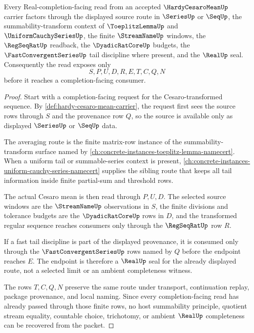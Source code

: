\begin{theorem}\label{thm:hardy-cesaro-mean-regular-transform-handoff}
Every Real-completion-facing read from an accepted $\HardyCesaroMeanUp$ carrier factors through the displayed source route in $\SeriesUp$ or $\SeqUp$, the summability-transform context of $\ToeplitzLemmaUp$ and $\UniformCauchySeriesUp$, the finite $\StreamNameUp$ windows, the $\RegSeqRatUp$ readback, the $\DyadicRatCoreUp$ budgets, the $\FastConvergentSeriesUp$ tail discipline where present, and the $\RealUp$ seal. Consequently the read exposes only
$$
S,P,U,D,R,E,T,C,Q,N
$$
before it reaches a completion-facing consumer.
\end{theorem}
\begin{proof}
Start with a completion-facing request for the Cesaro-transformed sequence. By \autoref{def:hardy-cesaro-mean-carrier}, the request first sees the source rows through $S$ and the provenance row $Q$, so the source is available only as displayed $\SeriesUp$ or $\SeqUp$ data.

The averaging route is the finite matrix-row instance of the summability-transform surface named by \autoref{ch:concrete-instances-toeplitz-lemma-namecert}. When a uniform tail or summable-series context is present, \autoref{ch:concrete-instances-uniform-cauchy-series-namecert} supplies the sibling route that keeps all tail information inside finite partial-sum and threshold rows.

The actual Cesaro mean is then read through $P,U,D$. The selected source windows are the $\StreamNameUp$ observations in $S$, the finite divisions and tolerance budgets are the $\DyadicRatCoreUp$ rows in $D$, and the transformed regular sequence reaches consumers only through the $\RegSeqRatUp$ row $R$.

If a fast tail discipline is part of the displayed provenance, it is consumed only through the $\FastConvergentSeriesUp$ rows named by $Q$ before the endpoint reaches $E$. The endpoint is therefore a $\RealUp$ seal for the already displayed route, not a selected limit or an ambient completeness witness.

The rows $T,C,Q,N$ preserve the same route under transport, continuation replay, package provenance, and local naming. Since every completion-facing read has already passed through those finite rows, no host summability principle, quotient stream equality, countable choice, trichotomy, or ambient $\RealUp$ completeness can be recovered from the packet.
\end{proof}

